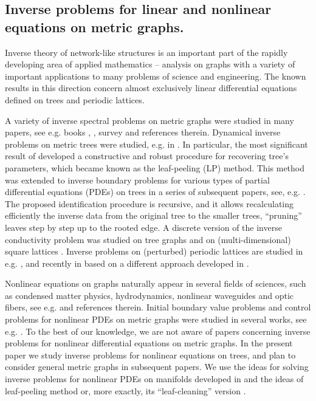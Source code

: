 \documentclass[11pt]{amsart}
\theoremstyle{definition}
\theoremstyle{plain}
\numberwithin{equation}{section}
\begin{document}
\subsection{Inverse problems for linear and nonlinear equations on metric graphs.}  Inverse theory of network-like structures is an important part of the rapidly developing area of
applied mathematics -- analysis on graphs with a variety of important applications to many problems of science and engineering. The known results in this direction concern almost exclusively linear differential equations defined on trees and periodic lattices.

A variety of inverse spectral problems on metric graphs were studied 
in many papers, see e.g. books \cite{BerkolaikoKuchment}, \cite{Kur2023}, survey \cite{Yurko2016} and references therein. Dynamical inverse problems on metric trees were studied, e.g. in \cite{AK08, avbell15, AE}.
  In particular, the most significant result of \cite{AK08} developed a constructive and robust procedure for recovering tree's parameters, which became known as the  leaf-peeling  (LP)  method.
  This method was extended to inverse boundary problems for various types of partial differential equations (PDEs) on trees
  in a series of subsequent papers, see, e.g. \cite{avbell15, ACLM, AMN, AZ21}.
  The proposed identification procedure is  recursive, and it allows
  recalculating efficiently the inverse data from the
  original tree to the smaller trees, ``pruning'' leaves step by step up to the rooted edge. 
  A discrete version of the inverse conductivity problem was studied on tree graphs \cite{GR} and on (multi-dimensional) square lattices \cite{CM,DJ}.
  Inverse problems on (perturbed) periodic lattices are studied in e.g. \cite{Ando13,AIM,ABE,IK,IM,LGGY,WYB}, and recently in \cite{BEILL} based on a different approach developed in \cite{BILL,BILL2}.
  
Nonlinear equations on graphs naturally appear in several fields of sciences, such as condensed matter physics, hydrodynamics, nonlinear waveguides and optic fibers, see e.g. \cite{Adami,Sobirov} and references therein.
  Initial boundary value problems and control problems for nonlinear PDEs on metric graphs were studied in several works, see e.g. \cite{mehmeti1994nonlinear,GLL}.  
To the best of our knowledge, we are not aware of papers concerning inverse problems for nonlinear differential equations on metric graphs. In the present paper we study inverse problems for nonlinear equations on trees, and plan to consider general metric graphs in subsequent papers. We use the ideas for solving inverse problems for nonlinear PDEs on manifolds developed in \cite{KLU} and
  the ideas of leaf-peeling method or, more exactly, its ``leaf-cleaning'' version \cite{avdonin2015source}.
\end{document}
